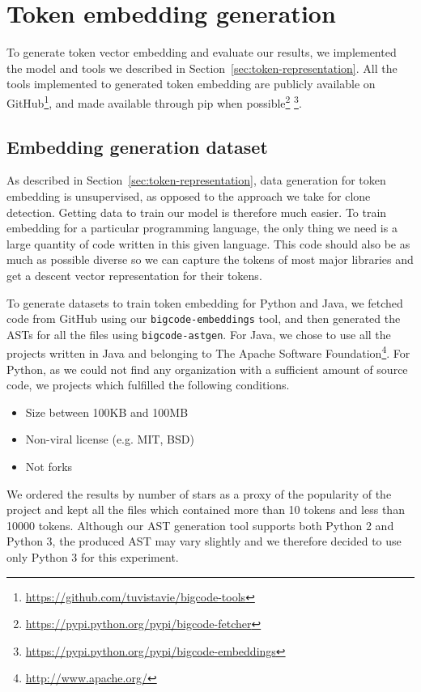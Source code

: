 \section{\label{sec:token-generation-experiments}Token embedding generation}
To generate token vector embedding and evaluate our results, we implemented the
model and tools we described in Section~\ref{sec:token-representation}. All the
tools implemented to generated token embedding are publicly available on
GitHub\footnote{\url{https://github.com/tuvistavie/bigcode-tools}}, and made
available through pip when
possible\footnote{\url{https://pypi.python.org/pypi/bigcode-fetcher}}
\footnote{\url{https://pypi.python.org/pypi/bigcode-embeddings}}.
%
\subsection{Embedding generation dataset}
As described in Section~\ref{sec:token-representation}, data generation for
token embedding is unsupervised, as opposed to the approach we take for clone
detection. Getting data to train our model is therefore much easier. To train
embedding for a particular programming language, the only thing we need is a
large quantity of code written in this given language. This code should also be
as much as possible diverse so we can capture the tokens of most major libraries
and get a descent vector representation for their tokens.

To generate datasets to train token embedding for Python and Java, we fetched
code from GitHub using our \lstinline{bigcode-embeddings} tool, and then
generated the ASTs for all the files using \lstinline{bigcode-astgen}.
For Java, we chose to use all the projects written in Java and belonging to The
Apache Software Foundation\footnote{\url{http://www.apache.org/}}. For Python,
as we could not find any organization with a sufficient amount of source code,
we projects which fulfilled the following conditions.

\begin{itemize}
\item Size between 100KB and 100MB
\item Non-viral license (e.g. MIT, BSD)
\item Not forks
\end{itemize}

We ordered the results by number of stars as a proxy of the popularity of the
project and kept all the files which contained more than 10 tokens and less than
10000 tokens. Although our AST generation tool supports both Python 2 and Python
3, the produced AST may vary slightly and we therefore decided to use only
Python 3 for this experiment.

